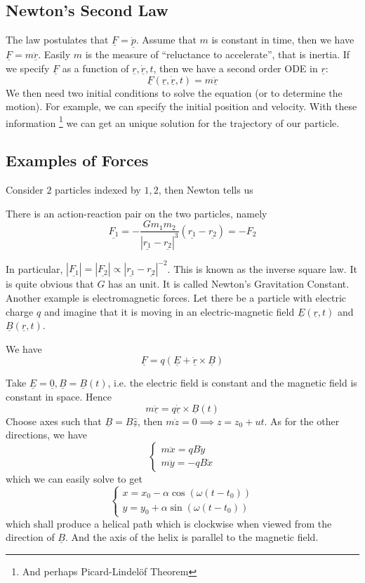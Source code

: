 \subsection{Newton's Second Law}
The law postulates that $\underline{F}=\underline{\dot{p}}$.
Assume that $m$ is constant in time, then we have $\underline{F}=m\underline{\ddot{r}}$.
Easily $m$ is the measure of ``reluctance to accelerate'', that is inertia.
If we specify $\underline{F}$ as a function of $\underline{r},\underline{\dot{r}},t$, then we have a second order ODE in $\underline{r}$:
$$\underline{F}(\underline{r},\underline{\dot{r}},t)=m\underline{\ddot{r}}$$
We then need two initial conditions to solve the equation (or to determine the motion).
For example, we can specify the initial position and velocity.
With these information
\footnote{And perhaps Picard-Lindel\"of Theorem}
we can get an unique solution for the trajectory of our particle.
\subsection{Examples of Forces}
Consider $2$ particles indexed by $1,2$, then Newton tells us
\begin{law}
    There is an action-reaction pair on the two particles, namely
    $$\underline{F_1}=-\frac{Gm_1m_2}{|\underline{r_1}-\underline{r_2}|^3}(\underline{r_1}-\underline{r_2})=-F_2$$
\end{law}
In particular, $|\underline{F_1}|=|\underline{F_2}|\propto|\underline{r_1}-\underline{r_2}|^{-2}$.
This is known as the inverse square law.
It is quite obvious that $G$ has an unit.
It is called Newton's Gravitation Constant.\\
Another example is electromagnetic forces.
Let there be a particle with electric charge $q$ and imagine that it is moving in an electric-magnetic field $\underline{E}(\underline{r},t)$ and $\underline{B}(\underline{r},t)$.
\begin{law}
    We have
    $$\underline{F}=q(\underline{E}+\underline{\dot{r}}\times\underline{B})$$
\end{law}
\begin{example}
    Take $\underline{E}=\underline{0},\underline{B}=\underline{B}(t)$, i.e. the electric field is constant and the magnetic field is constant in space.
    Hence
    $$m\underline{\ddot{r}}=q\underline{\dot{r}}\times\underline{B}(t)$$
    Choose axes such that $\underline{B}=B\underline{\hat{z}}$, then $m\ddot{z}=0\implies z=z_0+ut$.
    As for the other directions, we have
    $$\begin{cases}
        m\ddot{x}=qB\dot{y}\\
        m\ddot{y}=-qB\dot{x}
    \end{cases}$$
    which we can easily solve to get
    $$\begin{cases}
        x=x_0-\alpha\cos(\omega(t-t_0))\\
        y=y_0+\alpha\sin(\omega(t-t_0))
    \end{cases}$$
    which shall produce a helical path which is clockwise when viewed from the direction of $\underline{B}$.
    And the axis of the helix is parallel to the magnetic field.
\end{example}